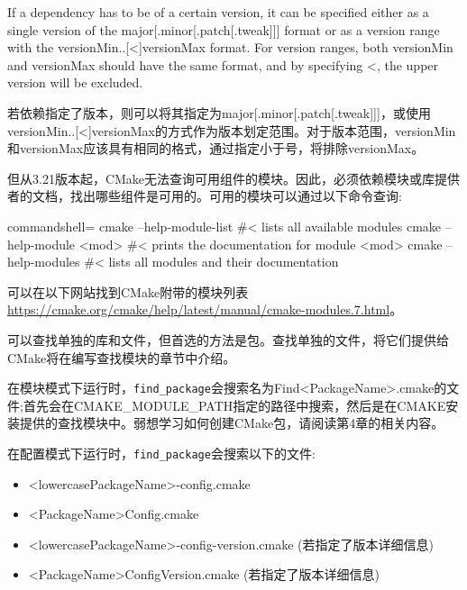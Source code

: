 If a dependency has to be of a certain version, it can be specified either as a single version of the major[.minor[.patch[.tweak]]] format or as a version range with the versionMin..[<]versionMax format. For version ranges, both versionMin and versionMax should have the same format, and by specifying <, the upper version will be excluded.

若依赖指定了版本，则可以将其指定为major[.minor[.patch[.tweak]]]，或使用versionMin..[<]versionMax的方式作为版本划定范围。对于版本范围，versionMin和versionMax应该具有相同的格式，通过指定小于号，将排除versionMax。

但从3.21版本起，CMake无法查询可用组件的模块。因此，必须依赖模块或库提供者的文档，找出哪些组件是可用的。可用的模块可以通过以下命令查询:

\begin{tcblisting}{commandshell={}}
cmake --help-module-list #< lists all available modules
cmake --help-module <mod> #< prints the documentation for
  module
  <mod>
cmake --help-modules #< lists all modules and their
  documentation
\end{tcblisting}

可以在以下网站找到CMake附带的模块列表\url{https://cmake.org/cmake/help/latest/manual/cmake-modules.7.html}。

\begin{tcolorbox}[colback=blue!5!white,colframe=blue!75!black,title=查找单个库和文件]
可以查找单独的库和文件，但首选的方法是包。查找单独的文件，将它们提供给CMake将在编写查找模块的章节中介绍。
\end{tcolorbox}

在模块模式下运行时，\texttt{find\_package}会搜索名为Find<PackageName>.cmake的文件;首先会在CMAKE\_MODULE\_PATH指定的路径中搜索，然后是在CMAKE安装提供的查找模块中。弱想学习如何创建CMake包，请阅读第4章的相关内容。

在配置模式下运行时，\texttt{find\_package}会搜索以下的文件:

\begin{itemize}
\item 
<lowercasePackageName>-config.cmake

\item 
<PackageName>Config.cmake

\item 
<lowercasePackageName>-config-version.cmake (若指定了版本详细信息)

\item 
<PackageName>ConfigVersion.cmake (若指定了版本详细信息)
\end{itemize}

